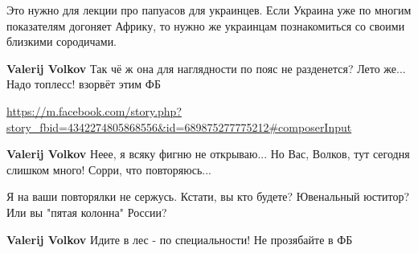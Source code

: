 \begin{itemize}
\begin{itemize}
Это нужно для лекции про папуасов для украинцев.
Если Украина уже по многим показателям догоняет Африку, то нужно же украинцам познакомиться со своими близкими сородичами.

 
\textbf{Valerij Volkov} Так чё ж она для наглядности по пояс не разденется? Лето же... Надо топлесс! взорвёт этим ФБ

 
\url{https://m.facebook.com/story.php?story_fbid=4342274805868556&id=689875277775212#composerInput}

 
\textbf{Valerij Volkov} Неее, я всяку фигню не открываю... Но Вас, Волков, тут сегодня слишком много! Сорри, что повторяюсь...

 
Я на ваши повторялки не сержусь.
Кстати, вы кто будете?
Ювенальный юститор?
Или вы "пятая колонна" России?

 
\textbf{Valerij Volkov} Идите в лес - по специальности! Не прозябайте в ФБ

 

\end{itemize}
\end{itemize}
